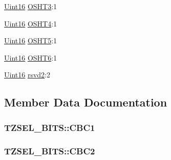 \begin{DoxyCompactItemize}
\item 
\hyperlink{_d_s_p2833x___device_8h_a59a9f6be4562c327cbfb4f7e8e18f08b}{Uint16} \hyperlink{struct_t_z_s_e_l___b_i_t_s_ac15249434559c42d7c9708945a6088ad}{O\+S\+H\+T3}\+:1
\item 
\hyperlink{_d_s_p2833x___device_8h_a59a9f6be4562c327cbfb4f7e8e18f08b}{Uint16} \hyperlink{struct_t_z_s_e_l___b_i_t_s_a1b236c6f20bcd2f01bd59c8de68bda3d}{O\+S\+H\+T4}\+:1
\item 
\hyperlink{_d_s_p2833x___device_8h_a59a9f6be4562c327cbfb4f7e8e18f08b}{Uint16} \hyperlink{struct_t_z_s_e_l___b_i_t_s_afb253f52d56aa31800530797efa6a242}{O\+S\+H\+T5}\+:1
\item 
\hyperlink{_d_s_p2833x___device_8h_a59a9f6be4562c327cbfb4f7e8e18f08b}{Uint16} \hyperlink{struct_t_z_s_e_l___b_i_t_s_a686769f5303fb01691a197884620c93c}{O\+S\+H\+T6}\+:1
\item 
\hyperlink{_d_s_p2833x___device_8h_a59a9f6be4562c327cbfb4f7e8e18f08b}{Uint16} \hyperlink{struct_t_z_s_e_l___b_i_t_s_ab31d39271cc393d2e6f5e8ca6fdec555}{rsvd2}\+:2
\end{DoxyCompactItemize}


\subsection{Member Data Documentation}
\hypertarget{struct_t_z_s_e_l___b_i_t_s_a15cc1188e9b27d116d93dc713d6a6f83}{}
\subsubsection[{C\+B\+C1}]{ T\+Z\+S\+E\+L\+\_\+\+B\+I\+T\+S\+::\+C\+B\+C1}\label{struct_t_z_s_e_l___b_i_t_s_a15cc1188e9b27d116d93dc713d6a6f83}
\hypertarget{struct_t_z_s_e_l___b_i_t_s_ae891eff0d90dce2041ea2c516cccf710}{}
\subsubsection[{C\+B\+C2}]{ T\+Z\+S\+E\+L\+\_\+\+B\+I\+T\+S\+::\+C\+B\+C2}\label{struct_t_z_s_e_l___b_i_t_s_ae891eff0d90dce2041ea2c516cccf710}
\hypertarget{struct_t_z_s_e_l___b_i_t_s_a40f244deef0c4f5e38f8f2395526b254}{}
